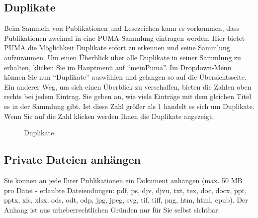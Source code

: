 \subsection{Duplikate}
Beim Sammeln von Publikationen und Lesezeichen kann es vorkommen, dass Publikationen zweimal in eine PUMA-Sammlung eintragen werden. Hier bietet PUMA die Möglichkeit Duplikate sofort zu erkennen und seine Sammlung aufzuräumen. Um einen Überblick über alle Duplikate in seiner Sammlung zu erhalten, klicken Sie im Hauptmenü auf \enquote{meinPuma}. Im Dropdown-Menü können Sie nun \enquote{Duplikate} auswählen und gelangen so auf die Übersichtsseite. Ein anderer Weg, um sich einen Überblick zu verschaffen, bieten die Zahlen oben rechts bei jedem Eintrag. Sie geben an, wie viele Einträge mit dem gleichen Titel es in der Sammlung gibt. Ist diese Zahl größer als 1 handelt es sich um Duplikate. Wenn Sie auf die Zahl klicken werden Ihnen die Duplikate angezeigt.
\begin{figure}[h!]
 \centering
 \caption{Duplikate}
 \label{figure027}
\end{figure}
\subsection{Private Dateien anhängen}
Sie können an jede Ihrer Publikationen ein Dokument anhängen (max. 50 MB pro Datei - erlaubte Dateiendungen: pdf, ps, djv, djvu, txt, tex, doc, docx, ppt, pptx, xls, xlsx, ods, odt, odp, jpg, jpeg, svg, tif, tiff, png, htm, html, epub). Der Anhang ist aus urheberrechtlichen Gründen nur für Sie selbst sichtbar.

